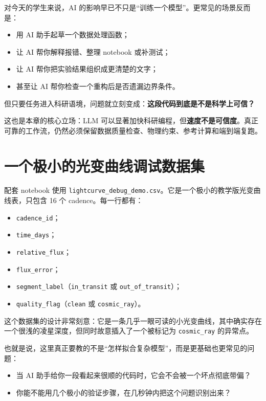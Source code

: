 对今天的学生来说，AI 的影响早已不只是“训练一个模型”。更常见的场景反而是：

\begin{itemize}
    \item 用 AI 助手起草一个数据处理函数；
    \item 让 AI 帮你解释报错、整理 notebook 或补测试；
    \item 让 AI 帮你把实验结果组织成更清楚的文字；
    \item 甚至让 AI 帮你检查一个重构后是否遗漏边界条件。
\end{itemize}

但只要任务进入科研语境，问题就立刻变成：\textbf{这段代码到底是不是科学上可信？}

这也是本章的核心立场：LLM 可以显著加快科研编程，但\textbf{速度不是可信度}。真正可靠的工作流，仍然必须保留数据质量检查、物理约束、参考计算和端到端复跑。

\section{一个极小的光变曲线调试数据集}

配套 notebook 使用 \nolinkurl{lightcurve_debug_demo.csv}。它是一个极小的教学版光变曲线表，只包含 16 个 cadence。每一行都有：

\begin{itemize}
    \item \texttt{cadence\_id}；
    \item \texttt{time\_days}；
    \item \texttt{relative\_flux}；
    \item \texttt{flux\_error}；
    \item \texttt{segment\_label}（\texttt{in\_transit} 或 \texttt{out\_of\_transit}）；
    \item \texttt{quality\_flag}（\texttt{clean} 或 \texttt{cosmic\_ray}）。
\end{itemize}

这个数据集的设计非常刻意：它是一条几乎一眼可读的小光变曲线，其中确实存在一个很浅的凌星深度，但同时故意插入了一个被标记为 \texttt{cosmic\_ray} 的异常点。

也就是说，这里真正要教的不是“怎样拟合复杂模型”，而是更基础也更常见的问题：

\begin{itemize}
    \item 当 AI 助手给你一段看起来很顺的代码时，它会不会被一个坏点彻底带偏？
    \item 你能不能用几个极小的验证步骤，在几秒钟内把这个问题识别出来？
\end{itemize}

